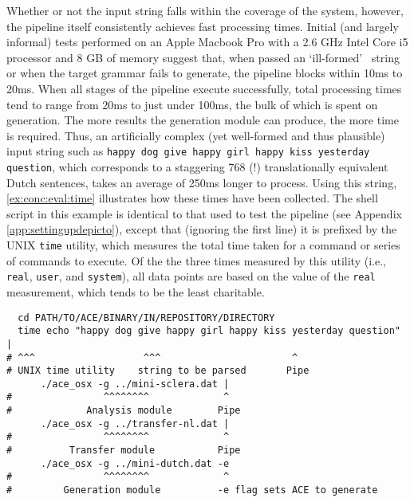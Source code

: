 Whether or not the input string falls within the coverage of the system,
however, the pipeline itself consistently achieves fast processing times.
Initial (and largely informal) tests performed on an Apple Macbook Pro with a
2.6 GHz Intel Core i5 processor and 8 GB of memory suggest that, when passed an
`ill-formed' \sclera\ string or when the target grammar fails to generate, the
pipeline blocks within 10ms to 20ms. When all stages of the pipeline execute
successfully, total processing times tend to range from 20ms to just under
100ms, the bulk of which is spent on generation. The more results the
generation module can produce, the more time is required. Thus, an artificially
complex (yet well-formed and thus plausible) input string such as \texttt{happy
dog give happy girl happy kiss yesterday question}, which corresponds to a
staggering 768 (!) translationally equivalent Dutch sentences, takes an average
of 250ms longer to process. Using this string, \cref{ex:conc:eval:time}
illustrates how these times have been collected. The shell script in this
example is identical to that used to test the pipeline (see Appendix
\ref{app:settingupdepicto}), except that (ignoring the first line) it is
prefixed by the UNIX \texttt{time} utility, which measures the total time taken
for a command or series of commands to execute. Of the the three times measured
by this utility (i.e., \texttt{real}, \texttt{user}, and \texttt{system}), all
data points are based on the value of the \texttt{real} measurement, which
tends to be the least charitable.

\begin{exe}
    \ex
    \label{ex:conc:eval:time}
    {\small
    \begin{verbatim}
  cd PATH/TO/ACE/BINARY/IN/REPOSITORY/DIRECTORY
  time echo "happy dog give happy girl happy kiss yesterday question" |
# ^^^                   ^^^                       ^
# UNIX time utility    string to be parsed       Pipe
      ./ace_osx -g ../mini-sclera.dat |
#                ^^^^^^^^             ^
#             Analysis module        Pipe
      ./ace_osx -g ../transfer-nl.dat |
#                ^^^^^^^^             ^
#          Transfer module           Pipe
      ./ace_osx -g ../mini-dutch.dat -e
#                ^^^^^^^^             ^
#         Generation module          -e flag sets ACE to generate
    \end{verbatim}
    }
\end{exe}

